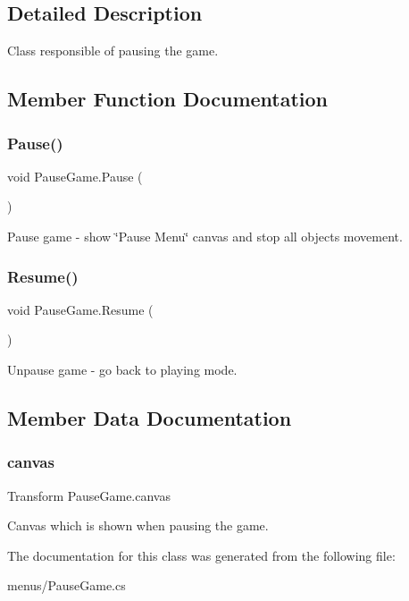 \subsection{Detailed Description}
Class responsible of pausing the game. 



\subsection{Member Function Documentation}
\mbox{\label{class_pause_game_a931478b9fc65d240b62a1cfa68607684}} 
\subsubsection{\texorpdfstring{Pause()}{Pause()}}
{\footnotesize\ttfamily void Pause\+Game.\+Pause (\begin{DoxyParamCaption}{ }\end{DoxyParamCaption})}



Pause game -\/ show \char`\"{}\+Pause Menu\char`\"{} canvas and stop all objects\textquotesingle{} movement. 

\mbox{\label{class_pause_game_a70d2c89455ef1f1970d5fc7b791b7566}} 
\subsubsection{\texorpdfstring{Resume()}{Resume()}}
{\footnotesize\ttfamily void Pause\+Game.\+Resume (\begin{DoxyParamCaption}{ }\end{DoxyParamCaption})}



Unpause game -\/ go back to playing mode. 



\subsection{Member Data Documentation}
\mbox{\label{class_pause_game_adf677814c2492d0887efd5ea18e6bba4}} 
\subsubsection{\texorpdfstring{canvas}{canvas}}
{\footnotesize\ttfamily Transform Pause\+Game.\+canvas}



Canvas which is shown when pausing the game. 



The documentation for this class was generated from the following file\+:\begin{DoxyCompactItemize}
\item 
menus/Pause\+Game.\+cs\end{DoxyCompactItemize}
